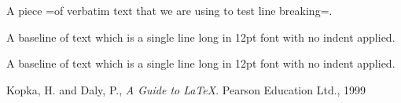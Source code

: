 \bigskip
A piece \spverb=of verbatim text that we are using to test line breaking=.


\bigskip

\noindent
A baseline of text which is a single line long in 12pt font with no indent applied.

\vspace{4\baselineskip}

\noindent
A baseline of text which is a single line long in 12pt font with no indent applied.\marginpar{\rule[-1ex]{0.3em}{4ex}}

\begin{thebibliography}{99}
 Kopka, H. and Daly, P., \textit{A Guide to \LaTeX}. Pearson Education Ltd., 1999
\end{thebibliography}



